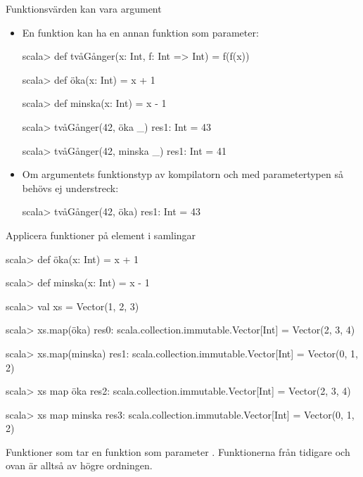 \begin{Slide}{Funktionsvärden kan vara argument}
\begin{itemize}
\item En funktion kan ha en annan funktion som parameter:
\begin{REPL}
scala> def tvåGånger(x: Int, f: Int => Int) = f(f(x))

scala> def öka(x: Int) = x + 1

scala> def minska(x: Int) = x - 1

scala> tvåGånger(42, öka _)
res1: Int = 43

scala> tvåGånger(42, minska _)
res1: Int = 41
\end{REPL}

\item Om argumentets funktionstyp  av kompilatorn och  med parametertypen så behövs ej understreck: \\ 
\begin{REPL}
scala> tvåGånger(42, öka)
res1: Int = 43
\end{REPL}\end{itemize}
\end{Slide}



\begin{Slide}{Applicera funktioner på element i samlingar}\SlideFontSmall
\begin{REPL}
scala> def öka(x: Int) = x + 1

scala> def minska(x: Int) = x - 1

scala> val xs = Vector(1, 2, 3)

scala> xs.map(öka)
res0: scala.collection.immutable.Vector[Int] = Vector(2, 3, 4)

scala> xs.map(minska)
res1: scala.collection.immutable.Vector[Int] = Vector(0, 1, 2)

scala> xs map öka
res2: scala.collection.immutable.Vector[Int] = Vector(2, 3, 4)

scala> xs map minska
res3: scala.collection.immutable.Vector[Int] = Vector(0, 1, 2)
\end{REPL}
Funktioner som tar en funktion som parameter . 
Funktionerna  från tidigare och  ovan är alltså av högre ordningen.
\end{Slide} 




